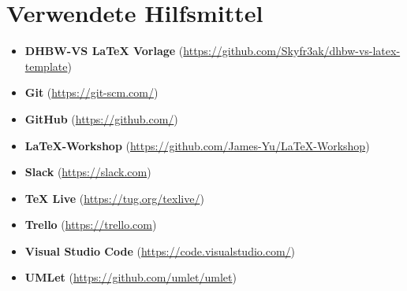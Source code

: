 
\section*{Verwendete Hilfsmittel}

\begin{itemize}
    \item \textbf{DHBW-VS LaTeX Vorlage} (\url{https://github.com/Skyfr3ak/dhbw-vs-latex-template})
    \item \textbf{Git} (\url{https://git-scm.com/})
    \item \textbf{GitHub} (\url{https://github.com/})
    \item \textbf{LaTeX-Workshop} (\url{https://github.com/James-Yu/LaTeX-Workshop})
    \item \textbf{Slack} (\url{https://slack.com})
    \item \textbf{TeX Live} (\url{https://tug.org/texlive/})
    \item \textbf{Trello} (\url{https://trello.com})
    \item \textbf{Visual Studio Code} (\url{https://code.visualstudio.com/})
    \item \textbf{UMLet} (\url{https://github.com/umlet/umlet})
\end{itemize}